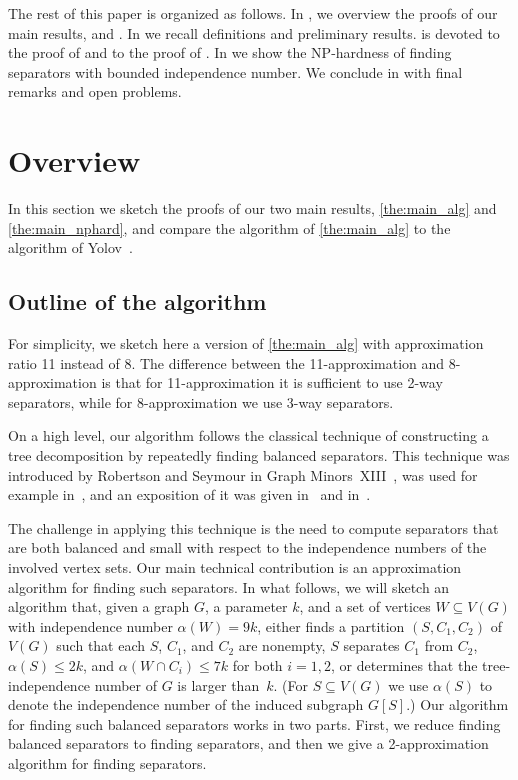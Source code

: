 \documentclass[11pt]{article}
\theoremstyle{definition}
\newcommand{\NP}{\textup{\textsf{NP}}}
\begin{document}
The rest of this paper is organized as follows.
In , we overview the proofs of our main results,  and .
In  we recall definitions and preliminary results.
 is devoted to the proof of  and  to the proof of .
In  we show the \NP-hardness of finding separators with bounded independence number.
We conclude in  with final remarks and open problems.


\section{Overview\label{sec:overview}}
In this section we sketch the proofs of our two main results, \cref{the:main_alg} and \cref{the:main_nphard}, and compare the algorithm of \cref{the:main_alg} to the algorithm of Yolov~\cite{Yolov18}.

\subsection{Outline of the algorithm\label{sec:alg_outline}}
For simplicity, we sketch here a version of \cref{the:main_alg} with approximation ratio 11 instead of 8.
The difference between the 11-approximation and 8-approximation is that for 11-approximation it is sufficient to use 2-way separators, while for 8-approximation we use 3-way separators.


On a high level, our algorithm follows the classical technique of constructing a tree decomposition by repeatedly finding balanced separators.
This technique was introduced by Robertson and Seymour in Graph Minors~XIII~\cite{RobertsonS-GMXIII}, was used for example in~\cite{DBLP:journals/siamcomp/BodlaenderDDFLP16,DBLP:journals/siamcomp/BergBKMZ20,DBLP:journals/algorithmica/JacobPRS22}, and an exposition of it was given in~\cite[Section~7.6.2]{cygan2015parameterized} and in~\cite{DBLP:conf/birthday/Pilipczuk20a}.

The challenge in applying this technique is the need to compute separators that are both balanced and small with respect to the independence numbers of the involved vertex sets. Our main technical contribution is an approximation algorithm for finding such separators.
In what follows, we will sketch an algorithm that, given a graph $G$, a parameter $k$, and a set of vertices $W \subseteq V(G)$ with independence number $\alpha(W) = 9k$, either finds a partition $(S, C_1, C_2)$ of $V(G)$ such that each $S$, $C_1$, and $C_2$ are nonempty, $S$ separates $C_1$ from $C_2$, $\alpha(S) \le 2k$, and $\alpha(W \cap C_i) \le 7k$ for both $i =1,2$, or determines that the tree-independence number of $G$ is larger than~$k$. (For $S\subseteq V(G)$ we use $\alpha(S)$  to denote the independence number of the induced subgraph $G[S]$.)
Our algorithm for finding such balanced separators works in two parts.
First, we reduce finding balanced separators to finding separators, and then we give a 2-approximation algorithm for finding separators.
\end{document}
